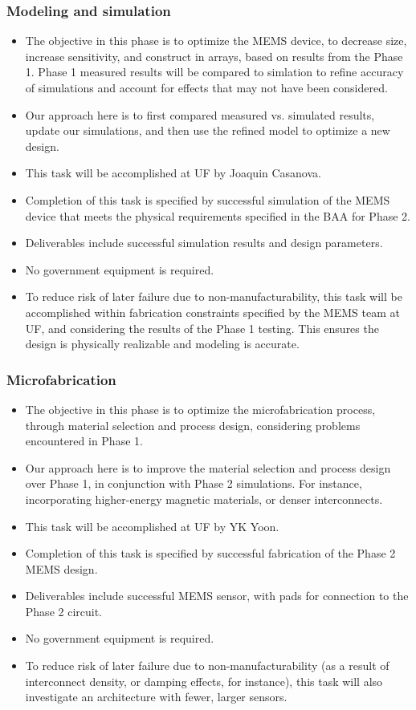 \subsubsection{Modeling and simulation}\label{sec:p2:em}
\begin{itemize}
\item The objective in this phase is to optimize the MEMS device, to decrease size, increase sensitivity, and construct in arrays, based on results from the Phase 1. Phase 1 measured results will be compared to simlation to refine accuracy of simulations and account for effects that may not have been considered.
\item Our approach here is to first compared measured vs. simulated results, update our simulations, and then use the refined model to optimize a new design.
\item This task will be accomplished at UF by Joaquin Casanova.
\item Completion of this task is specified by successful simulation of the MEMS device that meets the physical requirements specified in the BAA for Phase 2.
\item Deliverables include successful simulation results and design parameters.
\item No government equipment is required.
\item To reduce risk of later failure due to non-manufacturability, this task will be accomplished within fabrication constraints specified by the MEMS team at UF, and considering the results of the Phase 1 testing. This ensures the design is physically realizable and modeling is accurate.
\end{itemize}
\subsubsection{Microfabrication}\label{sec:p2:mf}
\begin{itemize}
\item The objective in this phase is to optimize the microfabrication process, through material selection and process design, considering problems encountered in Phase 1.
\item Our approach here is to improve the material selection and process design over Phase 1, in conjunction with Phase 2 simulations. For instance, incorporating higher-energy magnetic materials, or denser interconnects.
\item This task will be accomplished at UF by YK Yoon.
\item Completion of this task is specified by successful fabrication of the Phase 2 MEMS design.
\item Deliverables include successful MEMS sensor, with pads for connection to the Phase 2 circuit.
\item No government equipment is required.
\item To reduce risk of later failure due to non-manufacturability (as a result of interconnect density, or damping effects, for instance), this task will also investigate an architecture with fewer, larger sensors.
\end{itemize}
